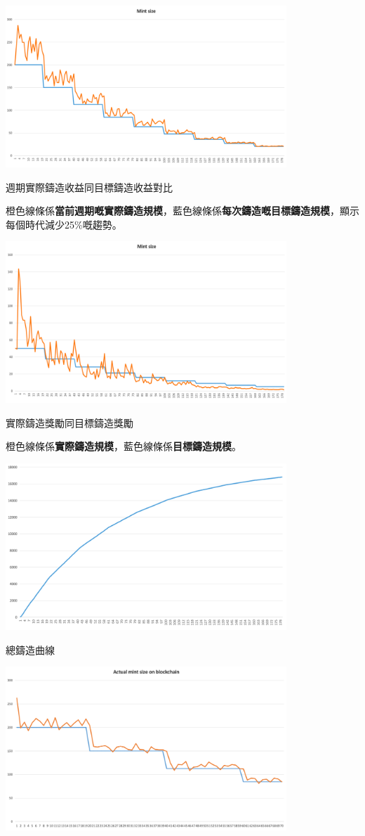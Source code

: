 \documentclass[
]{article}
\begin{document}
\includegraphics[width=400px]{image}

週期實際鑄造收益同目標鑄造收益對比

橙色線條係\textbf{當前週期嘅實際鑄造規模}，藍色線條係\textbf{每次鑄造嘅目標鑄造規模}，顯示每個時代減少25\%嘅趨勢。

\includegraphics[width=400px]{image1}

實際鑄造獎勵同目標鑄造獎勵

橙色線條係\textbf{實際鑄造規模}，藍色線條係\textbf{目標鑄造規模}。

\includegraphics[width=400px]{image2}

總鑄造曲線

\includegraphics[width=400px]{image3}
\end{document}
